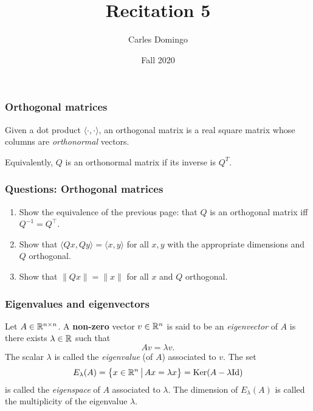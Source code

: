 \documentclass{beamer}
\title{Recitation 5}
\author{Carles Domingo}
\date{Fall 2020}
\begin{document}
\frame{\titlepage} 

\setcounter{showProgressBar}{0}
\setcounter{showSlideNumbers}{1}

\begin{frame}[t]
\frametitle{Orthogonal matrices}
\begin{definition}
	Given a dot product $\langle \cdot, \cdot \rangle$, an orthogonal matrix is a real square matrix whose columns are \emph{orthonormal} vectors.
\end{definition}
Equivalently, $Q$ is an orthonormal matrix if its inverse is $Q^{T}$.
\end{frame}

\begin{frame}[t]
\frametitle{Questions: Orthogonal matrices}
\begin{enumerate}
\item Show the equivalence of the previous page: that $Q$ is an orthogonal matrix iff $Q^{-1} = Q^{\top}$.
\item Show that $\langle Q x, Q y \rangle = \langle x, y \rangle$ for all $x, y$ with the appropriate dimensions and $Q$ orthogonal.
\item Show that $\|Qx\| = \|x\|$ for all $x$ and $Q$ orthogonal.
\pause
\pause
\end{enumerate}
\end{frame}

\iffalse
\begin{frame}[t]
\frametitle{Questions: Gram-Schmidt and QR}
\begin{enumerate}
\item Let $A\in \R^{n\times n}$ have linearly independent columns. Show that there is a matrix $Q\in \R^{n \times m}$ and $R \in \R^{n\times n} $ s.t that $A=QR$, where $Q$ has orthonormal columns and $R$ is upper triangular. \\
\medskip
(Hint: Recall the ``linear combination of columns interpretation of matrix multiplication").
\end{enumerate}
\end{frame}
\fi

\begin{frame}[t]
\frametitle{Eigenvalues and eigenvectors}
\begin{definition}\label{def:eigen}
	Let $A \in \R^{n \times n}$. A \textbf{non-zero} vector $v \in \mathbb{R}^n$ is said to be an \emph{eigenvector} of $A$ is there exists $\lambda \in \mathbb{R}$ such that
	$$
	A v = \lambda v.
	$$
	The scalar $\lambda$ is called the \emph{eigenvalue} (of $A$) associated to $v$. The set
	$$
	E_{\lambda}(A) = \big\{ x \in \mathbb{R}^n \, \big| \, Ax = \lambda x \big\} = {{\rm Ker}}(A-\lambda {{\rm Id}})
	$$
	is called the \emph{eigenspace} of $A$ associated to $\lambda$. The dimension of $E_{\lambda}(A)$ is called the multiplicity of the eigenvalue $\lambda$.
\end{definition}
\end{frame}
\end{document}
